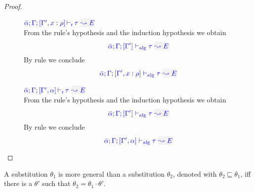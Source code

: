 \begin{proof}
\begin{description}
\item[]\quad
$\dlres{\bar\alpha}{\tenv}{\tenv',\relation{x}{\rulet}}{\type}{E}$\ \\

From the rule's hypothesis and the induction hypothesis we obtain
\begin{equation*}
  \adlres{\bar\alpha}{\tenv}{\tenv'}{\type}{E}
\end{equation*}
By rule  we conclude
\begin{equation*}
  \adlres{\bar\alpha}{\tenv}{\tenv',\relation{x}{\rulet}}{\type}{E}
\end{equation*}

\item[]\quad
$\dlres{\bar\alpha}{\tenv}{\tenv',\alpha}{\type}{E}$\ \\

From the rule's hypothesis and the induction hypothesis we obtain
\begin{equation*}
\adlres{\bar\alpha}{\tenv}{\tenv'}{\type}{E}
\end{equation*}
By rule  we conclude
\begin{equation*}
  \adlres{\bar\alpha}{\tenv}{\tenv',\alpha}{\type}{E}
\end{equation*}
\end{description}
\end{proof}

\begin{definition}
A substitution $\theta_1$ is more general than a substitution $\theta_2$, denoted with
$\theta_2\sqsubseteq\theta_1$, iff there is a $\theta'$ such that $\theta_2 = \theta_1\cdot\theta'$.
\end{definition}


